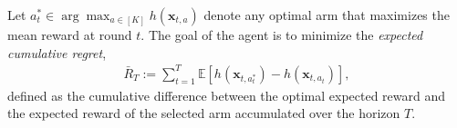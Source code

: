 \documentclass[pdflatex,sn-mathphys-num]{sn-jnl}%
\theoremstyle{thmstyleone}%
\theoremstyle{thmstyletwo}%
\theoremstyle{thmstylethree}%
\newcommand{\xbf}{\mathbf{x}}
\begin{document}
Let $a_t^* \in \arg\max_{a \in [K]} h(\xbf_{t,a})$ denote any optimal arm that maximizes the mean reward at round $t$. The goal of the agent is to minimize the \textit{expected cumulative regret}, 
\begin{align}\bar{R}_T:= \sum_{t=1}^T \mathbb{E}\left[ h(\xbf_{t, a_t^*}) - h(\xbf_{t, a_t}) \right], \label{eq:cum_regret} \end{align}
defined as the cumulative difference between the optimal expected reward and the expected reward of the selected arm accumulated over the horizon $T$.


\end{document}
